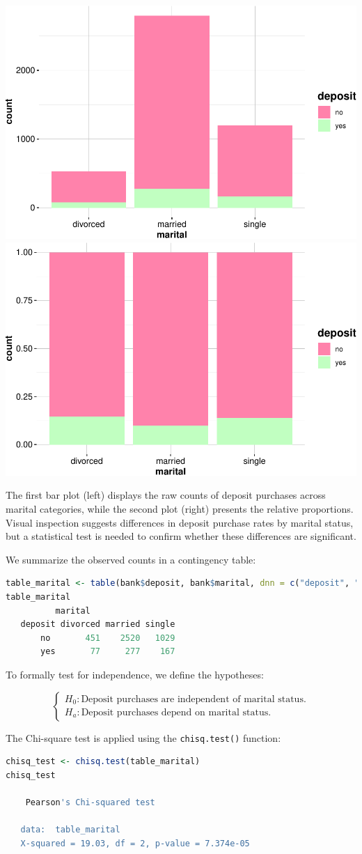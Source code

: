 \documentclass[
]{book}
\newcommand{\passthrough}[1]{#1}
\theoremstyle{definition}
\theoremstyle{definition}
\theoremstyle{definition}
\theoremstyle{definition}
\theoremstyle{remark}
\begin{document}
\includegraphics[width=0.5\linewidth]{statistics_files/figure-latex/unnamed-chunk-14-1} \includegraphics[width=0.5\linewidth]{statistics_files/figure-latex/unnamed-chunk-14-2}

The first bar plot (left) displays the raw counts of deposit purchases across marital categories, while the second plot (right) presents the relative proportions. Visual inspection suggests differences in deposit purchase rates by marital status, but a statistical test is needed to confirm whether these differences are significant.

We summarize the observed counts in a contingency table:

\begin{lstlisting}[language=R]
table_marital <- table(bank$deposit, bank$marital, dnn = c("deposit", "marital"))
table_marital
          marital
   deposit divorced married single
       no       451    2520   1029
       yes       77     277    167
\end{lstlisting}

To formally test for independence, we define the hypotheses:

\[
\begin{cases}
H_0: \text{Deposit purchases are independent of marital status.} \\ 
H_a: \text{Deposit purchases depend on marital status.}
\end{cases}
\]

The Chi-square test is applied using the \passthrough{\lstinline!chisq.test()!} function:

\begin{lstlisting}[language=R]
chisq_test <- chisq.test(table_marital)
chisq_test
   
    Pearson's Chi-squared test
   
   data:  table_marital
   X-squared = 19.03, df = 2, p-value = 7.374e-05
\end{lstlisting}
\end{document}
